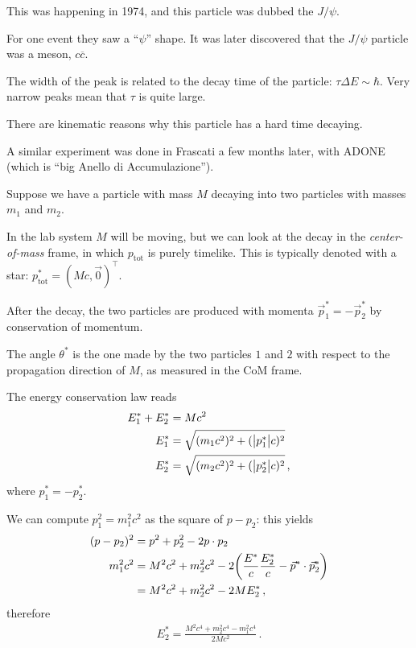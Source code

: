 \documentclass[main.tex]{subfiles}
\begin{document}
This was happening in 1974, and this particle was dubbed the \(J/\psi \). 

For one event they saw a ``\(\psi \)'' shape. 
It was later discovered that the \(J/\psi \) particle was a meson, \(c \overline{c}\).

The width of the peak is related to the decay time of the particle: \(\tau \Delta E \sim \hbar\). 
Very narrow peaks mean that \(\tau \) is quite large. 

There are kinematic reasons why this particle has a hard time decaying. 

A similar experiment was done in Frascati a few months later, with ADONE (which is ``big Anello di Accumulazione'').

Suppose we have a particle with mass \(M\) decaying into two particles with masses \(m_1 \) and \(m_2 \). 

In the lab system \(M\) will be moving, but we can look at the decay in the \emph{center-of-mass} frame, in which \(p _{\text{tot}}\) is purely timelike. 
This is typically denoted with a star: \(p^{*} _{\text{tot}} = (M c, \vec{0})^{\top}\). 

After the decay, the two particles are produced with momenta \(\vec{p}^{*}_1 = -\vec{p}^{*}_2\) by conservation of momentum. 

The angle \(\theta^{*}\) is the one made by the two particles \(1\) and \(2\) with respect to the propagation direction of \(M\), as measured in the CoM frame. 

The energy conservation law reads  
%
\begin{align}
E^{*}_{1} + E^{*}_{2} &= Mc^2 \\
E^{*}_{1} &= \sqrt{(m_1 c^2)^2 + (\abs{p^{*}_1} c)^2}\\
E^{*}_{2} &= \sqrt{(m_2 c^2)^2 + (\abs{p^{*}_2} c)^2}
\,,
\end{align}
%
where \(p^{*}_{1} = - p^{*}_{2}\). 

We can compute \(p_1^2 = m_1^2 c^2\) as the square of \(p - p_2 \): this yields 
%
\begin{align}
(p - p_2)^2 &= p^2 + p_2^2 - 2 p \cdot p_2   \\
m_1^2 c^2 &= M^2 c^2 +  m_2^2 c^2 - 2 \qty( \frac{E^{*}}{c} \frac{E^{*}_2}{c} - \vec{p}^{*} \cdot \vec{p}^{*}_{2})  \\
&= M^2c^2 + m_2^2c^2 - 2 M E^{*}_{2}
\,,
\end{align}
%
therefore 
%
\begin{align}
E^{*}_2 = \frac{M^2 c^4 + m_2^2 c^4 - m_1^2 c^4}{2Mc^2}
\,.
\end{align}
\end{document}
